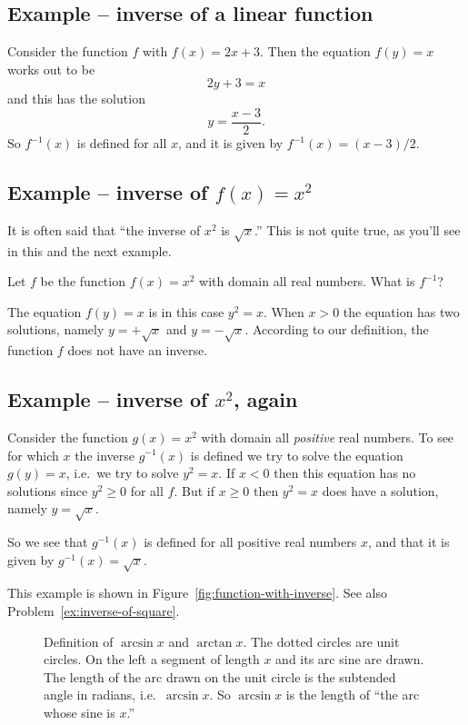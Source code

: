 \subsection{Example -- inverse of a linear function}
Consider the function $f$ with $f(x)=2x+3$.  Then the equation $f(y) = x$ works
out to be
\[
2y+3=x
\]
and this has the solution
\[
y=\frac{x-3}2.
\]
So $f^{-1}(x)$ is defined for all $x$, and it is given by $f^{-1}(x) = (x-3)/2$.

\subsection{Example -- inverse of $f(x) = x^2$}
It is often said that ``the inverse of $x^2$ is $\sqrt{x}$.{}'' This is not
quite true, as you'll see in this and the next example.


Let $f$ be the function $f(x) = x^2$ with domain all real numbers.  What is
$f^{-1}$?

The equation $f(y) = x$ is in this case $y^2=x$.  When $x>0$ the equation has
two solutions, namely $y=+\sqrt{x} $ and $y = -\sqrt{x}$.  According to our
definition, the function $f$ does not have an inverse.

\subsection{Example -- inverse of $x^2$, again}
\label{sec:inverse-of-square}%
Consider the function $g(x) = x^2$ with domain all \emph{positive} real numbers.
To see for which $x$ the inverse $g^{-1}(x)$ is defined we try to solve the
equation $g(y) =x$, i.e.\ we try to solve $y^2 = x$.  If $x<0$ then this
equation has no solutions since $y^2\geq0$ for all $f$.  But if $x\geq 0$ then
$y^2 = x$ does have a solution, namely $y = \sqrt{x}$.

So we see that $g^{-1}(x)$ is defined for all positive real numbers $x$, and
that it is given by $g^{-1}(x) = \sqrt x$.

This example is shown in Figure~\ref{fig:function-with-inverse}.  See also
Problem~\ref{ex:inverse-of-square}.


\begin{figure}[b]
  \centering 
  \caption{Definition of $\arcsin x$ and $\arctan x$.  The dotted circles are
    unit circles.  On the left a segment of length $x$ and its arc sine are
    drawn.  The length of the arc drawn on the unit circle is the subtended
    angle in radians, i.e.~$\arcsin x$.  So $\arcsin x$ is the length of ``the
    arc whose sine is $x$.''}
  \label{fig:01arcsine-arctan-definition}
\end{figure}

